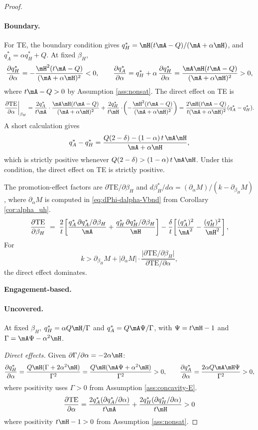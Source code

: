 \begin{proof}
\medskip
\paragraph{Boundary.}\;
For TE, the boundary condition gives $q_H^* = \mH (t\mA - Q)/(\mA+\alpha\mH)$,
and $q_A^* = \alpha q_H^* + Q$. At fixed $\beta_H$,
\[
\frac{\partial q_H^*}{\partial\alpha} = -\frac{\mH^2 (t\mA-Q)}{(\mA+\alpha\mH)^2} < 0,
\qquad
\frac{\partial q_A^*}{\partial\alpha} = q_H^* + \alpha\,\frac{\partial q_H^*}{\partial\alpha}
= \frac{\mA\mH (t\mA-Q)}{(\mA+\alpha\mH)^2} > 0,
\]
where $t\mA-Q>0$ by Assumption \ref{ass:nonsat}. The direct effect on TE is
\[
\frac{\partial\text{TE}}{\partial\alpha}\bigg|_{\beta_H}
= \frac{2q_A^*}{t\mA}\cdot\frac{\mA\mH (t\mA-Q)}{(\mA+\alpha\mH)^2}
+ \frac{2q_H^*}{t\mH}\cdot\!\left(-\frac{\mH^2 (t\mA-Q)}{(\mA+\alpha\mH)^2}\right)
= \frac{2\mH (t\mA-Q)}{t(\mA+\alpha\mH)^2}(q_A^* - q_H^*).
\]
A short calculation gives
\[
q_A^* - q_H^*
= \frac{Q(2-\delta) - (1-\alpha)\,t\,\mA\mH}{\mA + \alpha\mH},
\]
which is strictly positive whenever $Q(2-\delta) > (1-\alpha)\,t\,\mA\mH$.
Under this condition, the direct
effect on TE is strictly positive.

The promotion-effect factors are $\partial\text{TE}/\partial\beta_H$
and
$d\beta_H^*/d\alpha = (\partial_\alpha M)/(k -
\partial_{\beta_H}M)$, where $\partial_\alpha M$ is computed in \eqref{eq:dPhi-dalpha-Vbnd} from Corollary \ref{cor:alpha_uh}.
\[
\frac{\partial\text{TE}}{\partial\beta_H}
\;=\; \frac{2}{t}\!\left[\frac{q_A^*\,\partial q_A^*/\partial\beta_H}{\mA}
+ \frac{q_H^*\,\partial q_H^*/\partial\beta_H}{\mH}\right]
- \frac{\delta}{t}\!\left[\frac{(q_A^*)^2}{\mA^2} - \frac{(q_H^*)^2}{\mH^2}\right],
\]
For 
\begin{equation}\label{eq:kbar-alpha-TE-V-bnd}
k > \partial_{\beta_H}M
+ \bigl|\partial_\alpha M\bigr|\cdot
\frac{\bigl|\partial\text{TE}/\partial\beta_H\bigr|}{\partial\text{TE}/\partial\alpha},
\end{equation}
the direct effect dominates.

\medskip
\textbf{Engagement-based.}
\paragraph{Uncovered.}\;
At fixed $\beta_H$, $q_H^* = \alpha Q\mH/\Gamma$ and
$q_A^* = Q\mA\Psi/\Gamma$, with $\Psi = t\mH - 1$ and
$\Gamma = \mA\Psi - \alpha^2\mH$.

\emph{Direct effects.} Given $\partial\Gamma/\partial\alpha = -2\alpha\mH$:
\[
\frac{\partial q_H^*}{\partial\alpha}
= \frac{Q\mH(\Gamma + 2\alpha^2\mH)}{\Gamma^2}=
\frac{Q\mH(\mA\Psi +\alpha^2\mH)}{\Gamma^2}> 0,
\qquad
\frac{\partial q_A^*}{\partial\alpha}
= \frac{2\alpha Q\mA\mH\Psi}{\Gamma^2} > 0,
\]
where positivity uses $\Gamma> 0$ from Assumption \ref{ass:concavity-E}.
\[
\frac{\partial\text{TE}}{\partial\alpha} = \frac{2q_A^* (\partial q_A^*/\partial \alpha)}{t\mA}
+ \frac{2q_H^* (\partial q_H^*/\partial \alpha)}{t\mH} > 0
\]
where positivity $t\mH-1>0$ from Assumption \ref{ass:nonsat}.


\end{proof}

